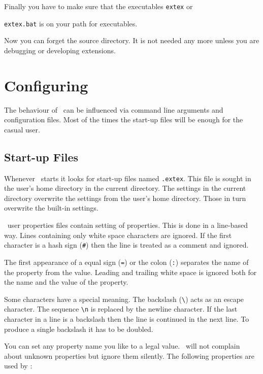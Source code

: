 \documentclass{extex-doc}
\makeatletter
\newcommand\File[1]{\texttt{#1}\index{#1@\textsf{#1}}}
\newcommand\Prog[1]{\texttt{#1}\index{#1}}
\makeatother
\begin{document}
Finally you have to make sure that the executables \Prog{extex} or

\Prog{extex.bat} is on your path for executables.

Now you can forget the source directory. It is not needed any more
unless you are debugging or developing \ExTeX{} extensions.


\section{Configuring \ExTeX}

The behaviour of \ExTeX\ can be influenced via command line arguments
and configuration files. Most of the times the start-up files will be
enough for the casual user.


\subsection{Start-up Files}

Whenever \ExTeX\ starts it looks for start-up files named
\File{.extex}. This file is sought in the user's home directory in the
current directory. The settings in the current directory overwrite the
settings from the user's home directory. Those in turn overwrite the
built-in settings.

\ExTeX\ user properties files contain setting of properties. This is
done in a line-based way. Lines containing only white space characters
are ignored. If the first character is a hash sign (\verb|#|) then the
line is treated as a comment and ignored.

The first appearance of a equal sign (\verb|=|) or the colon
(\verb|:|) separates the name of the property from the value. Leading
and trailing white space is ignored both for the name and the value of
the property.

Some characters have a special meaning. The backslash (\verb|\|) acts
as an escape character. The sequence \verb|\n| is replaced by the
newline character. If the last character in a line is a backslash then
the line is continued in the next line. To produce a single backslash
it has to be doubled.

You can set any property name you like to a legal value. \ExTeX\ will
not complain about unknown properties but ignore them silently.
The following properties are used by \ExTeX:
\end{document}
